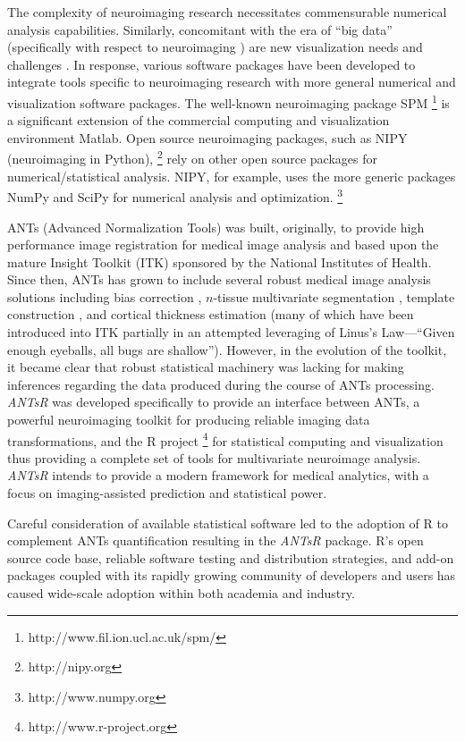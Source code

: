 \documentclass[preprint,authoryear,review,12pt]{elsarticle}
\begin{document}
The complexity of neuroimaging research necessitates 
commensurable numerical analysis capabilities.  Similarly, concomitant
with the era of ``big data'' (specifically with respect to neuroimaging
\citep{vanhorn2013}) are new visualization needs and challenges
\citep{childs2013,kehrer2013}.
In response, various software packages have been developed to
integrate tools specific to neuroimaging research with more general
numerical and visualization software packages.
The well-known neuroimaging package SPM%
\footnote{
http://www.fil.ion.ucl.ac.uk/spm/
}
is a significant extension of the commercial computing and visualization environment
Matlab.  Open source neuroimaging packages, such as NIPY (neuroimaging in Python),%
\footnote{
http://nipy.org
} 
rely on other open source packages for numerical/statistical analysis.  NIPY,
for example, uses the more generic packages NumPy and SciPy for numerical analysis and 
optimization.%
\footnote{
http://www.numpy.org
}  

ANTs (Advanced Normalization Tools) was built, originally, to provide 
high performance image registration for medical image analysis
\citep{avants2008a} and based upon the mature Insight Toolkit (ITK)
sponsored by the National Institutes of Health.  Since then, ANTs has grown to include 
several robust medical image analysis solutions including bias 
correction \citep{tustison2010}, $n$-tissue multivariate segmentation 
\citep{avants2011}, template construction \citep{avants2010}, and cortical 
thickness estimation \citep{das2009} (many of which have been
introduced into ITK partially in an attempted leveraging of Linus's Law---``Given enough eyeballs, all bugs are shallow'').  
However, in the evolution of the toolkit, it became clear 
that robust statistical machinery was lacking for making inferences regarding
the data produced during the course of ANTs processing.  \textit{ANTsR} was developed
specifically to provide an interface between ANTs, a 
powerful neuroimaging toolkit for producing reliable imaging data 
transformations, and the R project%
\footnote{
http://www.r-project.org
}
for statistical computing and visualization thus providing a complete
set of tools for multivariate neuroimage analysis.  
 \textit{ANTsR} intends to provide a modern framework for medical analytics, 
 with a focus on imaging-assisted prediction and statistical power.


Careful consideration of available statistical software 
led to the adoption of R to complement ANTs quantification resulting in the
\textit{ANTsR} package.
R's open source code base, reliable software testing and distribution strategies,
and add-on packages coupled with its rapidly growing 
community of developers and users has caused wide-scale
adoption within both academia and industry.
\end{document}
